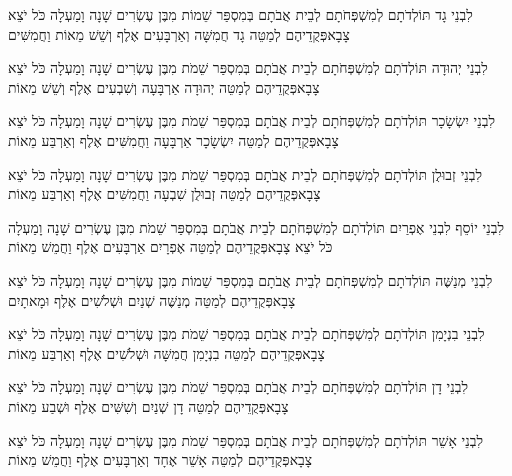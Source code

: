 \documentclass[../main/main.tex]{subfiles}
\begin{document}
\begin{multicols}{\ncols}
לִבְנֵי גָד תּוֹלְדֹתָם לְמִשְׁפְּחֹתָם לְבֵית אֲבֹתָם בְּמִסְפַּר שֵׁמוֹת מִבֶּן עֶשְׂרִים שָׁנָה וָמַעְלָה כֹּל יֹצֵא צָבָא\PreVerseSpace{}פְּקֻדֵיהֶם לְמַטֵּה גָד חֲמִשָּׁה וְאַרְבָּעִים אֶלֶף וְשֵׁשׁ מֵאוֹת וַחֲמִשִּׁים\OpenSection{}\par
{}לִבְנֵי יְהוּדָה תּוֹלְדֹתָם לְמִשְׁפְּחֹתָם לְבֵית אֲבֹתָם בְּמִסְפַּר שֵׁמֹת מִבֶּן עֶשְׂרִים שָׁנָה וָמַעְלָה כֹּל יֹצֵא צָבָא\PreVerseSpace{}פְּקֻדֵיהֶם לְמַטֵּה יְהוּדָה אַרְבָּעָה וְשִׁבְעִים אֶלֶף וְשֵׁשׁ מֵאוֹת\OpenSection{}\par
{}לִבְנֵי יִשְׂשָׂכָר תּוֹלְדֹתָם לְמִשְׁפְּחֹתָם לְבֵית אֲבֹתָם בְּמִסְפַּר שֵׁמֹת מִבֶּן עֶשְׂרִים שָׁנָה וָמַעְלָה כֹּל יֹצֵא צָבָא\PreVerseSpace{}פְּקֻדֵיהֶם לְמַטֵּה יִשְׂשָׂכָר אַרְבָּעָה וַחֲמִשִּׁים אֶלֶף וְאַרְבַּע מֵאוֹת\OpenSection{}\par
{}לִבְנֵי זְבוּלֻן תּוֹלְדֹתָם לְמִשְׁפְּחֹתָם לְבֵית אֲבֹתָם בְּמִסְפַּר שֵׁמֹת מִבֶּן עֶשְׂרִים שָׁנָה וָמַעְלָה כֹּל יֹצֵא צָבָא\PreVerseSpace{}פְּקֻדֵיהֶם לְמַטֵּה זְבוּלֻן שִׁבְעָה וַחֲמִשִּׁים אֶלֶף וְאַרְבַּע מֵאוֹת\OpenSection{}\par
{}לִבְנֵי יוֹסֵף לִבְנֵי אֶפְרַיִם תּוֹלְדֹתָם לְמִשְׁפְּחֹתָם לְבֵית אֲבֹתָם בְּמִסְפַּר שֵׁמֹת מִבֶּן עֶשְׂרִים שָׁנָה וָמַעְלָה כֹּל יֹצֵא צָבָא\PreVerseSpace{}פְּקֻדֵיהֶם לְמַטֵּה אֶפְרָיִם אַרְבָּעִים אֶלֶף וַחֲמֵשׁ מֵאוֹת\OpenSection{}\par
{}לִבְנֵי מְנַשֶּׁה תּוֹלְדֹתָם לְמִשְׁפְּחֹתָם לְבֵית אֲבֹתָם בְּמִסְפַּר שֵׁמוֹת מִבֶּן עֶשְׂרִים שָׁנָה וָמַעְלָה כֹּל יֹצֵא צָבָא\PreVerseSpace{}פְּקֻדֵיהֶם לְמַטֵּה מְנַשֶּׁה שְׁנַיִם וּשְׁלֹשִׁים אֶלֶף וּמָאתָיִם\OpenSection{}\par
{}לִבְנֵי בִנְיָמִן תּוֹלְדֹתָם לְמִשְׁפְּחֹתָם לְבֵית אֲבֹתָם בְּמִסְפַּר שֵׁמֹת מִבֶּן עֶשְׂרִים שָׁנָה וָמַעְלָה כֹּל יֹצֵא צָבָא\PreVerseSpace{}פְּקֻדֵיהֶם לְמַטֵּה בִנְיָמִן חֲמִשָּׁה וּשְׁלֹשִׁים אֶלֶף וְאַרְבַּע מֵאוֹת\OpenSection{}\par
{}לִבְנֵי דָן תּוֹלְדֹתָם לְמִשְׁפְּחֹתָם לְבֵית אֲבֹתָם בְּמִסְפַּר שֵׁמֹת מִבֶּן עֶשְׂרִים שָׁנָה וָמַעְלָה כֹּל יֹצֵא צָבָא\PreVerseSpace{}פְּקֻדֵיהֶם לְמַטֵּה דָן שְׁנַיִם וְשִׁשִּׁים אֶלֶף וּשְׁבַע מֵאוֹת\OpenSection{}\par
{}לִבְנֵי אָשֵׁר תּוֹלְדֹתָם לְמִשְׁפְּחֹתָם לְבֵית אֲבֹתָם בְּמִסְפַּר שֵׁמֹת מִבֶּן עֶשְׂרִים שָׁנָה וָמַעְלָה כֹּל יֹצֵא צָבָא\PreVerseSpace{}פְּקֻדֵיהֶם לְמַטֵּה אָשֵׁר אֶחָד וְאַרְבָּעִים אֶלֶף וַחֲמֵשׁ מֵאוֹת\OpenSection{}\par

\end{multicols}
\end{document}
